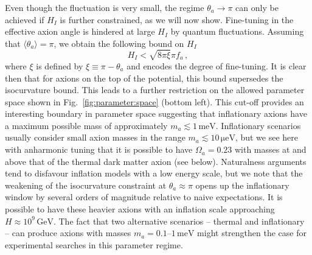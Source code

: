 \documentclass[preprint,nofootinbib]{revtex4}
\newcommand{\reffig}[1]{Fig.~\ref{#1}}
\newcommand{\units}[1]{\, \mathrm{#1}}
\begin{document}
Even though the fluctuation is very small, the regime $\theta_a \to \pi$ can only be achieved if $H_I$ is further constrained, as we will now show. Fine-tuning in the effective axion angle is hindered at large $H_I$ by quantum fluctuations. Assuming that $\langle \theta_a \rangle = \pi$, we obtain the following bound on $H_I$
\begin{equation}
 H_I < \sqrt{8\pi\xi} \pi f_a\,,
\end{equation}
where $\xi$ is defined by $\xi\equiv\pi-\theta_a$ and encodes the degree of fine-tuning. It is clear then that for axions on the top of the potential, this bound supersedes the isocurvature bound. This leads to a further restriction on the  allowed parameter space shown in \reffig{fig:parameter:space} (bottom left). This cut-off provides an interesting boundary in parameter space suggesting that inflationary axions have a maximum possible mass of approximately $m_a\lesssim 1\units{meV}$. Inflationary scenarios usually consider small axion masses in the range $m_a \lesssim 10\units{\mu eV}$, but we see here with anharmonic tuning that it is possible to have $\Omega_a = 0.23$ with masses at and above that of the thermal dark matter axion (see below). Naturalness arguments tend to disfavour inflation models with a low energy scale, but we note that the weakening of the isocurvature constraint at $\theta_a \approx \pi$ opens up the inflationary window by several orders of magnitude relative to naive expectations. It is possible to have these heavier axions with an inflation scale approaching $H\approx 10^9 \units{GeV}$. The fact that two alternative scenarios -- thermal and inflationary -- can produce axions with masses $m_a = 0.1$--$1\units{meV}$ might strengthen the case for experimental searches in this parameter regime.
\end{document}

